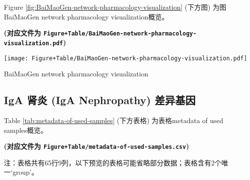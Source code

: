 \documentclass[
]{article}
\begin{document}
Figure \ref{fig:BaiMaoGen-network-pharmacology-visualization} (下方图) 为图BaiMaoGen network pharmacology visualization概览。

\textbf{(对应文件为 \texttt{Figure+Table/BaiMaoGen-network-pharmacology-visualization.pdf})}

\def\@captype{figure}
\begin{center}
\texttt{[image: Figure+Table/BaiMaoGen-network-pharmacology-visualization.pdf]}
\caption{BaiMaoGen network pharmacology visualization}\label{fig:BaiMaoGen-network-pharmacology-visualization}
\end{center}

\hypertarget{iga-ux80beux708e-iga-nephropathy-ux5deeux5f02ux57faux56e0}{%
\subsection{IgA 肾炎 (IgA Nephropathy) 差异基因}\label{iga-ux80beux708e-iga-nephropathy-ux5deeux5f02ux57faux56e0}}

Table \ref{tab:metadata-of-used-samples} (下方表格) 为表格metadata of used samples概览。

\textbf{(对应文件为 \texttt{Figure+Table/metadata-of-used-samples.csv})}

\begin{center}\begin{tcolorbox}[colback=gray!10, colframe=gray!50, width=0.9\linewidth, arc=1mm, boxrule=0.5pt]注：表格共有65行9列，以下预览的表格可能省略部分数据；表格含有2个唯一`group'。
\end{tcolorbox}
\end{center}
\end{document}
